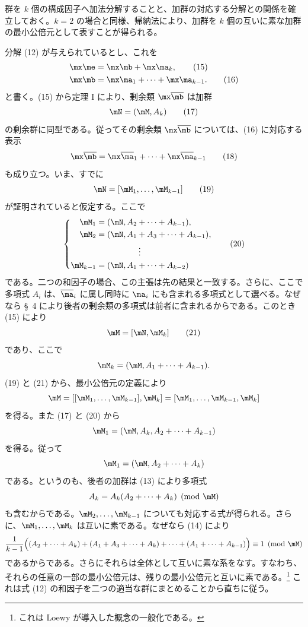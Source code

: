 \documentclass[11pt]{article}
\begin{document}
群を $k$ 個の構成因子へ加法分解することと、加群の対応する分解との関係を確立しておく。$k=2$ の場合と同様、帰納法により、加群を $k$ 個の互いに素な加群の最小公倍元として表すことが得られる。

分解 (12) が与えられているとし、これを
\begin{align}
 \mx\me&=\mx\mb+\mx\ma_k,\tag{15}\\
 \mx\mb&=\mx\ma_1+\cdots+\mx\ma_{k-1}.\tag{16}
\end{align}
と書く。(15) から定理 I により、剰余類 $\mx\overline{\mb}$ は加群
\begin{equation}
 \mN=(\mM,A_k)
\tag{17}
\end{equation}
の剰余群に同型である。従ってその剰余類 $\mx\overline{\mb}$ については、(16) に対応する表示
\begin{equation}
 \mx\overline{\mb}=\mx\overline{\ma}_1+\cdots+\mx\overline{\ma}_{k-1}
\tag{18}
\end{equation}
も成り立つ。いま、すでに
\begin{equation}
 \mN=[\mM_1,\ldots,\mM_{k-1}]
\tag{19}
\end{equation}
が証明されていると仮定する。ここで
\begin{equation}
\left\{
\begin{aligned}
 \mM_1&=(\mN,A_2+\cdots+A_{k-1}),\\
 \mM_2&=(\mN,A_1+A_3+\cdots+A_{k-1}),\\
 &\hspace{1.8cm}\vdots\\
 \mM_{k-1}&=(\mN,A_1+\cdots+A_{k-2})
\end{aligned}\right.
\tag{20}
\end{equation}
である。二つの和因子の場合、この主張は先の結果と一致する。さらに、ここで多項式 $A_i$ は、$\overline{\ma}_i$ に属し同時に $\ma_i$ にも含まれる多項式として選べる。なぜなら \S~4 により後者の剰余類の多項式は前者に含まれるからである。このとき (15) により
\begin{equation}
 \mM=[\mN,\mM_k]
\tag{21}
\end{equation}
であり、ここで
\[
 \mM_k=(\mM,A_1+\cdots+A_{k-1}).
\]
(19) と (21) から、最小公倍元の定義により
\[
 \mM=[[\mM_1,
 \ldots,\mM_{k-1}],\mM_k]=[\mM_1,\ldots,\mM_{k-1},\mM_k]
\]
を得る。また (17) と (20) から
\[
 \mM_1=(\mM,A_k,A_2+\cdots+A_{k-1})
\]
を得る。従って
\[
 \mM_1=(\mM,A_2+\cdots+A_k)
\]
である。というのも、後者の加群は (13) により多項式
\[
 A_k=A_k(A_2+\cdots+A_k)\pmod{\mM}
\]
も含むからである。$\mM_2,\ldots,\mM_{k-1}$ についても対応する式が得られる。さらに、$\mM_1,
\ldots,\mM_k$ は互いに素である。なぜなら (14) により
\[
 \frac{1}{k-1}\Bigl((A_2+\cdots+A_k)+(A_1+A_3+\cdots+A_k)+\cdots+(A_1+\cdots+A_{k-1})\Bigr)\equiv1\pmod{\mM}
\]
であるからである。さらにそれらは全体として互いに素な系をなす。すなわち、それらの任意の一部の最小公倍元は、残りの最小公倍元と互いに素である。\footnote{これは Loewy が導入した概念の一般化である。} これは式 (12) の和因子を二つの適当な群にまとめることから直ちに従う。
\end{document}
